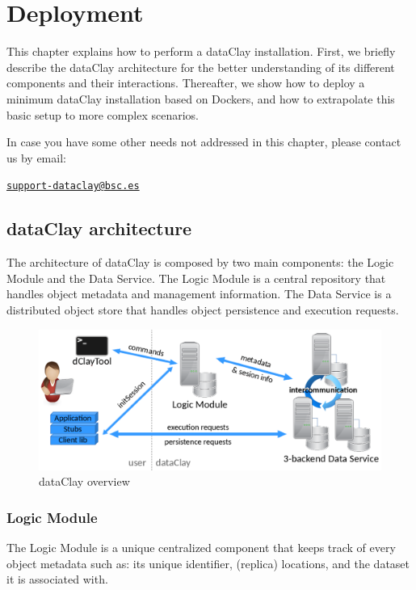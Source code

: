 
\chapter{Deployment}
\label{sec:SystemInstall}

This chapter explains how to perform a dataClay installation. First, we briefly describe the dataClay architecture for the better understanding of its different components and their interactions. Thereafter, we show how to deploy a minimum dataClay installation based on Dockers, and how to extrapolate this basic setup to more complex scenarios.

In case you have some other needs not addressed in this chapter, please contact us by email:

\texttt{\href{mailto:support-dataclay@bsc.es}{support-dataclay@bsc.es}}



\section{dataClay architecture}
The architecture of dataClay is composed by two main components: the Logic Module and the Data Service. The Logic Module is a central repository that handles object metadata and management information. The Data Service is a distributed object store that handles object persistence and execution requests.

\begin{figure}[h]
\centering\includegraphics[scale=0.4]{Installation/dataClayOverview}
\caption{dataClay overview}
\label{fig:dataClayOverview}
\end{figure}

\subsection{Logic Module}
The Logic Module is a unique centralized component that keeps track of every object metadata such as: its unique identifier, (replica) locations, and the dataset it is associated with. 

